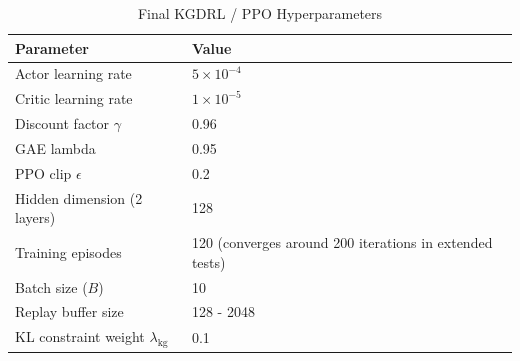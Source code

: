 \begin{table}[htbp]
\centering
\caption{Final KGDRL / PPO Hyperparameters}
\label{tab:hyperparams}
\begin{tabular}{ll}
\hline
Parameter & Value \\
\hline
Actor learning rate & $5 \times 10^{-4}$ \\
Critic learning rate & $1 \times 10^{-5}$ \\
Discount factor $\gamma$ & 0.96 \\
GAE lambda & 0.95 \\
PPO clip $\epsilon$ & 0.2 \\
Hidden dimension (2 layers) & 128 \\
Training episodes & 120 (converges around 200 iterations in extended tests)\\
Batch size ($B$) & 10 \\
Replay buffer size & 128 - 2048 \\
KL constraint weight $\lambda_{\text{kg}}$ & 0.1 \\
\hline
\end{tabular}
\end{table}
